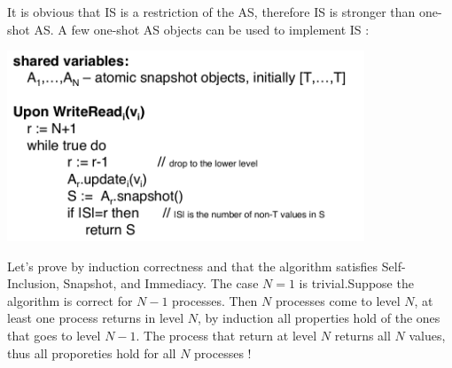 \documentclass{article}
\theoremstyle{definition}
\begin{document}
It is obvious that IS is a restriction of the AS, therefore IS is stronger than one-shot AS. A few one-shot AS objects can be used to implement IS :
\begin{center}
\includegraphics[width=0.8\textwidth]{implem_is}\\
\end{center}

Let's prove by induction correctness and that the algorithm satisfies Self-Inclusion, Snapshot, and Immediacy. The case $N=1$ is trivial.Suppose the algorithm is correct for $N-1$ processes. Then $N$ processes come to level $N$, at least one process returns in level $N$, by induction all properties hold of the ones that goes to level $N-1$. The process that return at level $N$ returns all $N$ values, thus all proporeties hold for all $N$ processes !
\end{document}
